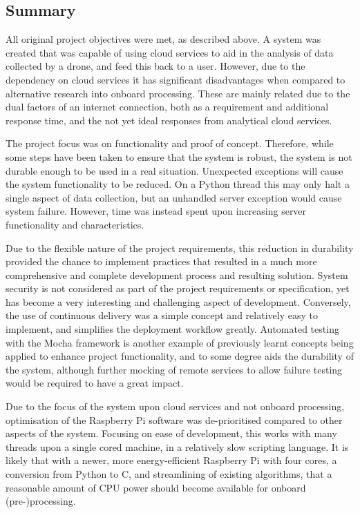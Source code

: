 \documentclass{article}
\begin{document}
\subsection{Summary}
All original project objectives were met, as described above. A system was created that was capable of using cloud services to aid in the analysis of data collected by a drone, and feed this back to a user. However, due to the dependency on cloud services it has significant disadvantages when compared to alternative research into onboard processing. These are mainly related due to the dual factors of an internet connection, both as a requirement and additional response time, and the not yet ideal responses from analytical cloud services. 

The project focus was on functionality and proof of concept. Therefore, while some steps have been taken to ensure that the system is robust, the system is not durable enough to be used in a real situation. Unexpected exceptions will cause the system functionality to be reduced. On a Python thread this may only halt a single aspect of data collection, but an unhandled server exception would cause system failure. However, time was instead spent upon increasing server functionality and characteristics. 

Due to the flexible nature of the project requirements, this reduction in durability provided the chance to implement practices that resulted in a much more comprehensive and complete development process and resulting solution. System security is not considered as part of the project requirements or specification, yet has become a very interesting and challenging aspect of development. Conversely, the use of continuous delivery was a simple concept and relatively easy to implement, and simplifies the deployment workflow greatly. Automated testing with the Mocha framework is another example of previously learnt concepts being applied to enhance project functionality, and to some degree aids the durability of the system, although further mocking of remote services to allow failure testing would be required to have a great impact.

Due to the focus of the system upon cloud services and not onboard processing, optimisation of the Raspberry Pi software was de-prioritised compared to other aspects of the system. Focusing on ease of development, this works with many threads upon a single cored machine, in a relatively slow scripting language. It is likely that with a newer, more energy-efficient Raspberry Pi with four cores, a conversion from Python to C, and streamlining of existing algorithms, that a reasonable amount of CPU power should become available for onboard (pre-)processing.
\end{document}
